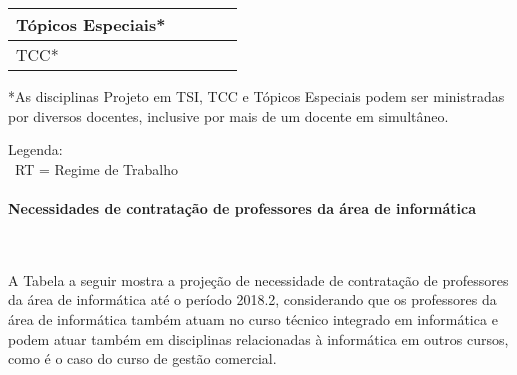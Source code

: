 \begin{table}[h!]
\begin{tabular}{lllll}
\multicolumn{1}{|l|}{T\'opicos Especiais*}                                                      & \multicolumn{1}{l|}{} & \multicolumn{1}{l|}{}  & \multicolumn{1}{l|}{}             & \multicolumn{1}{l|}{}                          \\ \hline
\multicolumn{1}{|l|}{TCC*}                                                         & \multicolumn{1}{l|}{}       & \multicolumn{1}{l|}{} & \multicolumn{1}{l|}{}       & \multicolumn{1}{l|}{}                        \\ \hline
\end{tabular}
\end{table}

\newpage
*As disciplinas Projeto em TSI, TCC e T\'opicos Especiais podem ser ministradas por diversos docentes, inclusive por mais de um docente em simult\^aneo.

Legenda:
\\~RT = Regime de Trabalho

\paragraph{Necessidades de contrata\c{c}\~ao de professores da \'area de inform\'atica}\


A Tabela a seguir mostra a proje\c{c}\~ao de necessidade de contrata\c{c}\~ao de professores da \'area de inform\'atica at\'e o per\'iodo 2018.2, considerando que os professores da \'area de inform\'atica tamb\'em atuam no curso t\'ecnico integrado em inform\'atica e podem atuar tamb\'em em disciplinas relacionadas \`a inform\'atica em outros cursos, como \'e o caso do curso de gest\~ao comercial.

